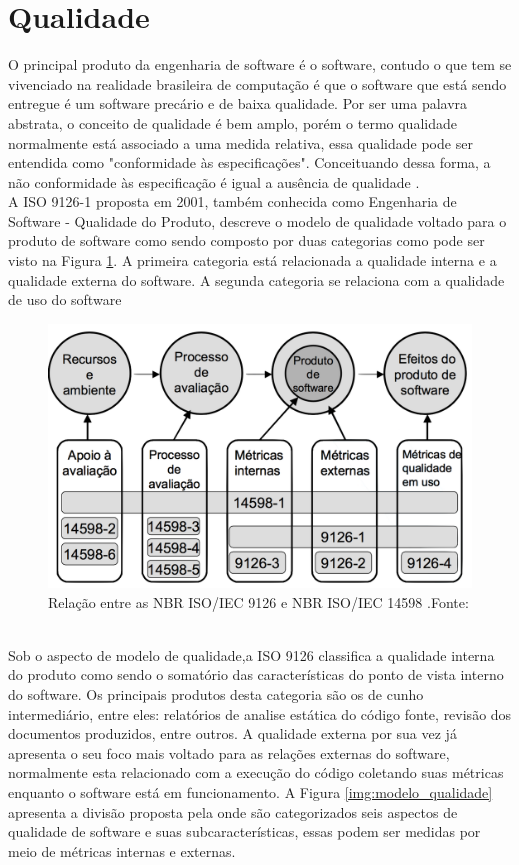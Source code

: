 \section{Qualidade}
	O principal produto da engenharia de software é o software, contudo o que tem se vivenciado na realidade brasileira de computação é que o software que está sendo entregue é um software precário e de baixa qualidade. Por ser uma palavra abstrata, o conceito de qualidade é bem amplo, porém o termo qualidade normalmente está associado a uma medida relativa, essa qualidade pode ser entendida como "conformidade às especificações". Conceituando dessa forma, a não conformidade às especificação é igual a ausência de qualidade \cite{Paduelli}.
\\ A ISO 9126-1 proposta em 2001, também conhecida como Engenharia de Software - Qualidade do Produto, descreve o modelo de qualidade voltado para o produto de software como sendo composto por duas categorias como pode ser visto na Figura \ref{img:relacao_iso}. A primeira categoria está relacionada a qualidade interna e a qualidade externa do software. A segunda categoria se relaciona com a qualidade de uso do software \cite{_nbr_2016}
\graphicspath{{figuras/}}
\begin{figure}[h]
\centering
\includegraphics[scale=0.40]{ISO}
\caption{Relação entre as NBR ISO/IEC 9126 e NBR ISO/IEC 14598 .Fonte:\cite{_nbr_2016}}
\label{img:relacao_iso}
\end{figure}
\\ Sob o aspecto de modelo de qualidade,a ISO 9126 classifica a qualidade interna do produto como sendo o somatório das características do ponto de vista interno do software. Os principais produtos desta categoria são os de cunho intermediário, entre eles: relatórios de analise estática do código fonte, revisão dos documentos produzidos, entre outros. A qualidade externa por sua vez já apresenta o seu foco mais voltado para as relações externas do software, normalmente esta relacionado com a execução do código coletando suas métricas enquanto o software está em funcionamento. A Figura \ref{img:modelo_qualidade} apresenta a divisão proposta pela \cite{_nbr_2016} onde são categorizados seis aspectos de qualidade de software e suas subcaracterísticas, essas podem ser medidas por meio de métricas internas e externas. 
